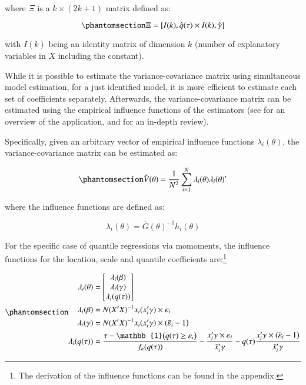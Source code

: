 \documentclass[
  authoryear,
  review,
  1p]{elsarticle}
\begin{document}
where \(\Xi\) is a \(k \times (2k+1)\) matrix defined as:

\begin{equation}\phantomsection\label{eq-eqqtile}{\Xi = [ I(k), \hat q(\tau) \times I(k), \hat \gamma ]
}\end{equation}

with \(I(k)\) being an identity matrix of dimension \(k\) (number of
explanatory variables in \(X\) including the constant).

While it is possible to estimate the variance-covariance matrix using
simultaneous model estimation, for a just identified model, it is more
efficient to estimate each set of coefficients separately. Afterwards,
the variance-covariance matrix can be estimated using the empirical
influence functions of the estimators (see \citet{jann_2020} for an
overview of the application, and \citet{hampel2005} for an in-depth
review).

Specifically, given an arbitrary vector of empirical influence functions
\(\lambda_i(\theta)\), the variance-covariance matrix can be estimated
as:

\begin{equation}\phantomsection\label{eq-eqvcv}{\hat{V}(\theta) = \frac{1}{N^2} \sum_{i=1}^N \lambda_i(\theta) \lambda_i(\theta)'
}\end{equation}

where the influence functions are defined as:

\[\lambda_i(\theta) = \bar G(\theta)^{-1} h_i(\theta)\]

For the specific case of quantile regressions via momoments, the
influence functions for the location, scale and quantile coefficients
are:\footnote{The derivation of the influence functions can be found in
  the appendix.}

\begin{equation}\phantomsection\label{eq-ifs}{\begin{aligned}
\lambda_i(\theta)&=
  \begin{bmatrix}
  \lambda_{i}(\beta) \\
  \lambda_{i}(\gamma) \\
  \lambda_{i}(q(\tau)) 
  \end{bmatrix} \\
\lambda_{i}(\beta)&=N (X'X)^{-1}  x_i ( x_i'\gamma) \times \varepsilon_i \\
\lambda_{i}(\gamma)&= N(X'X)^{-1} x_i ( x_i' \gamma ) \times (\tilde \varepsilon_i -1\big)\\
\lambda_{i}(q(\tau))&=\frac{\tau-\mathbb{1}\big( q(\tau)  \geq \varepsilon_i  \big) }{f_{\varepsilon}(q(\tau))}
- \frac{ x_i'\gamma \times \varepsilon_i }{\bar x_i'\gamma} 
-  q(\tau) \frac{  x_i' \gamma  \times (\tilde \varepsilon_i -1\big)}{\bar x_i'\gamma}
\end{aligned}
}\end{equation}
\end{document}
